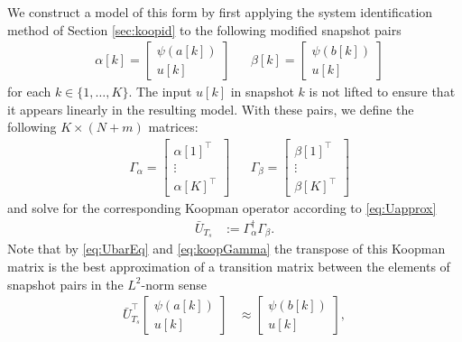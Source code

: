 We construct a model of this form by first applying the system identification method of Section \ref{sec:koopid} to the following modified snapshot pairs
\begin{align}
    &\alpha[k] = \begin{bmatrix} \psi(a[k]) \\ u[k] \end{bmatrix} 
    &&\beta[k] = \begin{bmatrix} \psi(b[k]) \\ u[k] \end{bmatrix}
    \label{eq:alpha}
\end{align}
for each $k \in \{1,\ldots,K\}$. 
The input $u[k]$ in snapshot $k$ is not lifted to ensure that it appears linearly in the resulting model.
With these pairs, we define the following ${K \times (N + m)}$ matrices:
\begin{align}
    &\Gamma_\alpha = \begin{bmatrix} \alpha[1]^\top \\ \vdots \\  \alpha[K]^\top \end{bmatrix}
    &&\Gamma_\beta = \begin{bmatrix} \beta[1]^\top \\ \vdots \\  \beta[K]^\top \end{bmatrix}
    \label{eq:Gamma}
\end{align}
and solve for the corresponding Koopman operator according to \eqref{eq:Uapprox}
\begin{align}
    \bar{U}_{T_s} &:= \Gamma_{\alpha}^\dagger \Gamma_\beta.
    \label{eq:koopGamma}
\end{align}
Note that by \eqref{eq:UbarEq} and \eqref{eq:koopGamma} the transpose of this Koopman matrix is the best approximation of a transition matrix between the elements of snapshot pairs in the $L^2$-norm sense \
\begin{align}
    \bar{U}_{T_s}^\top 
    \begin{bmatrix} \psi(a[k]) \\ u[k] \end{bmatrix} &\approx
    \begin{bmatrix} \psi(b[k]) \\ u[k] \end{bmatrix},
\end{align}
